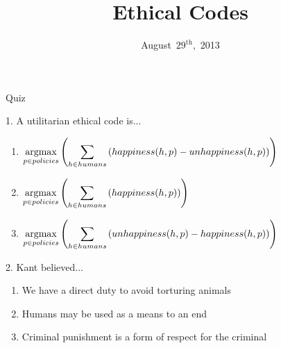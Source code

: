 \documentclass{beamer}
\title[Ethical Codes]{Ethical Codes}
\date{August~$29^{\text{th}}$,~2013}
\begin{document}
\begin{frame}
\titlepage
\end{frame}

\begin{frame}{Quiz}

\begin{block}{1. A utilitarian ethical code is...}
\begin{enumerate}[label=(\Alph*)]
\item<1-3> $\displaystyle \operatorname*{argmax}_{p \in policies} \left( \sum_{h \in humans} \left( happiness(h, p) - unhappiness(h, p)\right)\right)$
\item<1> $\displaystyle \operatorname*{argmax}_{p \in policies} \left( \sum_{h \in humans} \left( happiness(h, p)\right)\right)$
\item<1> $\displaystyle \operatorname*{argmax}_{p \in policies} \left( \sum_{h \in humans} \left( unhappiness(h, p) - happiness(h, p)\right)\right)$
\end{enumerate}
\end{block}
\begin{block}{2. Kant believed...}
\begin{enumerate}[label=(\Alph*)]
\item<1-2> We have a direct duty to avoid torturing animals
\item<1-2> Humans may be used as a means to an end
\item<1-3> Criminal punishment is a form of respect for the criminal
\end{enumerate}
\end{block}
\end{frame}
\end{document}
